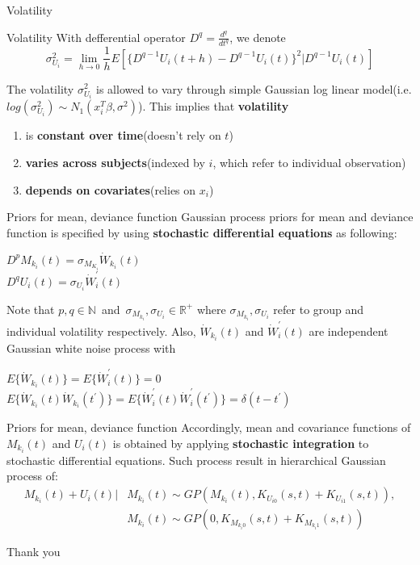 \documentclass[10pt]{beamer}
\def\mean{M_{k_i}(t)}
\def\dev{U_i(t)}
\def\vol{\sigma_{U_i}^2}
\begin{document}
\begin{frame}[t]{Volatility}
\vspace{4pt}
\begin{block}{Volatility}
\vspace{0.5em}
With defferential operator $D^q=\displaystyle\frac{d^q}{dt^q}$, we denote\\
$$\vol=\lim\limits_{h \to 0}\displaystyle\frac{1}{h}E[\{D^{q-1}U_i(t+h)-D^{q-1}\dev\}^2|D^{q-1}\dev]$$
\vspace{0.5em}
\end{block}
The volatility $\vol$ is allowed to vary through simple Gaussian log linear model(i.e. $log(\vol)\sim N_1(x_{i}^{T}\beta,\sigma^2)$). This implies that \textbf{volatility}
\begin{enumerate}
\item is \textbf{constant over time}(doesn't rely on $t$)
\item \textbf{varies across subjects}(indexed by $i$, which refer to individual observation)
\item \textbf{depends on covariates}(relies on $x_i$)
\end{enumerate}
\end{frame}


\begin{frame}[t]{Priors for mean, deviance function}
\vspace{4pt}
Gaussian process priors for mean and deviance function is specified by using \textbf{stochastic differential equations} as following:
\begin{center}
    $D^pM_{k_i}(t)=\sigma_{M_{K_i}}\dot{W}_{k_i}(t)$\\
    $D^qU_i(t)=\sigma_{U_i}\dot{W}_{i}^{'}(t)$
\end{center}
Note that $p, q \in \mathbb{N}$\ and\  $\sigma_{M_{k_i}}, \sigma_{U_i} \in \mathbb{R}^+$ where $\sigma_{M_{k_i}}, \sigma_{U_i}$ refer to group and individual volatility respectively. Also, $\dot{W}_{k_i}(t)$ and $\dot{W}_{i}^{'}(t)$ are independent Gaussian white noise process with
\begin{center}
    $E\{\dot{W}_{k_i}(t)\}=E\{\dot{W}_{i}^{'}(t)\}=0$\\
    $E\{\dot{W}_{k_i}(t)\dot{W}_{k_i}(t^{'})\}=E\{\dot{W}_{i}^{'}(t)\dot{W}_{i}^{'}(t^{'})\}=\delta(t-t^{'})$
\end{center}
\end{frame}


\begin{frame}[t]{Priors for mean, deviance function}
\vspace{4pt}
Accordingly, mean and covariance functions of $\mean$ and $\dev$ is obtained by applying \textbf{stochastic integration} to stochastic differential equations. Such process result in hierarchical Gaussian process of:
\begin{align*}
\mean +\dev | & \mean \sim GP(\mean , K_{U_{i0}}(s,t)+K_{U_{i1}}(s,t)),\\
	& \mean \sim GP(0 , K_{M_{k_{i}0}}(s,t)+K_{M_{k_{i}1}}(s,t))
\end{align*}
\end{frame}

\begin{frame}[standout]
\flushleft
Thank you
\end{frame}
\end{document}
